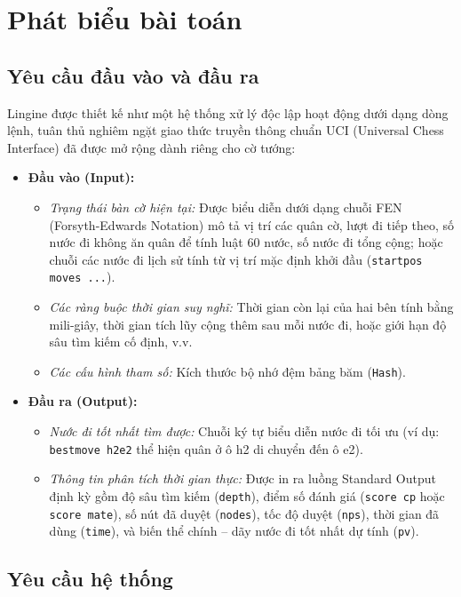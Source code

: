 \section{Phát biểu bài toán}

\subsection{Yêu cầu đầu vào và đầu ra}

Lingine được thiết kế như một hệ thống xử lý độc lập hoạt động dưới dạng dòng lệnh, tuân thủ nghiêm ngặt giao thức truyền thông chuẩn UCI (Universal Chess Interface) đã được mở rộng dành riêng cho cờ tướng:

\begin{itemize}
    \item \textbf{Đầu vào (Input):}
    \begin{itemize}
        \item \textit{Trạng thái bàn cờ hiện tại:} Được biểu diễn dưới dạng chuỗi FEN (Forsyth-Edwards Notation) mô tả vị trí các quân cờ, lượt đi tiếp theo, số nước đi không ăn quân để tính luật 60 nước, số nước đi tổng cộng; hoặc chuỗi các nước đi lịch sử tính từ vị trí mặc định khởi đầu (\texttt{startpos moves ...}).
        \item \textit{Các ràng buộc thời gian suy nghĩ:} Thời gian còn lại của hai bên tính bằng mili-giây, thời gian tích lũy cộng thêm sau mỗi nước đi, hoặc giới hạn độ sâu tìm kiếm cố định, v.v.
        \item \textit{Các cấu hình tham số:} Kích thước bộ nhớ đệm bảng băm (\texttt{Hash}).
    \end{itemize}
    \item \textbf{Đầu ra (Output):}
    \begin{itemize}
        \item \textit{Nước đi tốt nhất tìm được:} Chuỗi ký tự biểu diễn nước đi tối ưu (ví dụ: \texttt{bestmove h2e2} thể hiện quân ở ô h2 di chuyển đến ô e2).
        \item \textit{Thông tin phân tích thời gian thực:} Được in ra luồng Standard Output định kỳ gồm độ sâu tìm kiếm (\texttt{depth}), điểm số đánh giá (\texttt{score cp} hoặc \texttt{score mate}), số nút đã duyệt (\texttt{nodes}), tốc độ duyệt (\texttt{nps}), thời gian đã dùng (\texttt{time}), và biến thể chính -- dãy nước đi tốt nhất dự tính (\texttt{pv}).
    \end{itemize}
\end{itemize}

\subsection{Yêu cầu hệ thống}


